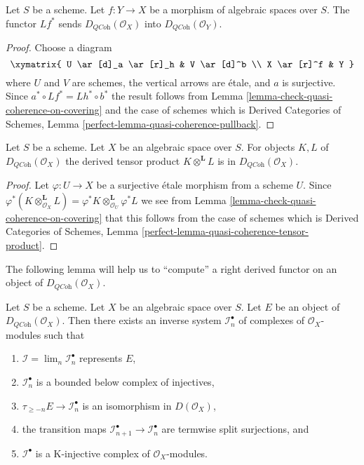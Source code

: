\begin{lemma}
\label{lemma-quasi-coherence-pullback}
Let $S$ be a scheme.
Let $f : Y \to X$ be a morphism of algebraic spaces over $S$.
The functor $Lf^*$ sends $D_{\textit{QCoh}}(\mathcal{O}_X)$
into $D_{\textit{QCoh}}(\mathcal{O}_Y)$.
\end{lemma}

\begin{proof}
Choose a diagram
$$
\xymatrix{
U \ar[d]_a \ar[r]_h & V \ar[d]^b \\
X \ar[r]^f & Y
}
$$
where $U$ and $V$ are schemes, the vertical arrows are \'etale, and
$a$ is surjective. Since $a^* \circ Lf^* = Lh^* \circ b^*$ the result
follows from
Lemma \ref{lemma-check-quasi-coherence-on-covering}
and the case of schemes which is
Derived Categories of Schemes, Lemma
\ref{perfect-lemma-quasi-coherence-pullback}.
\end{proof}

\begin{lemma}
\label{lemma-quasi-coherence-tensor-product}
Let $S$ be a scheme. Let $X$ be an algebraic space over $S$.
For objects $K, L$ of $D_{\textit{QCoh}}(\mathcal{O}_X)$
the derived tensor product $K \otimes^\mathbf{L} L$ is in
$D_{\textit{QCoh}}(\mathcal{O}_X)$.
\end{lemma}

\begin{proof}
Let $\varphi : U \to X$ be a surjective \'etale morphism from a scheme $U$.
Since
$\varphi^*(K \otimes_{\mathcal{O}_X}^\mathbf{L} L) =
\varphi^*K \otimes_{\mathcal{O}_U}^\mathbf{L} \varphi^*L$
we see from
Lemma \ref{lemma-check-quasi-coherence-on-covering}
that this follows from the case of schemes which is
Derived Categories of Schemes, Lemma
\ref{perfect-lemma-quasi-coherence-tensor-product}.
\end{proof}

\noindent
The following lemma will help us to ``compute'' a right derived functor
on an object of $D_{\textit{QCoh}}(\mathcal{O}_X)$.

\begin{lemma}
\label{lemma-nice-K-injective}
Let $S$ be a scheme. Let $X$ be an algebraic space over $S$. Let $E$ be an
object of $D_{\textit{QCoh}}(\mathcal{O}_X)$. Then there exists an inverse
system $\mathcal{I}_n^\bullet$ of complexes of $\mathcal{O}_X$-modules
such that
\begin{enumerate}
\item $\mathcal{I} = \lim_n \mathcal{I}_n^\bullet$ represents $E$,
\item $\mathcal{I}_n^\bullet$ is a bounded below complex of injectives,
\item $\tau_{\geq -n}E \to \mathcal{I}_n^\bullet$ is an isomorphism
in $D(\mathcal{O}_X)$,
\item the transition maps
$\mathcal{I}_{n + 1}^\bullet \to \mathcal{I}_n^\bullet$
are termwise split surjections, and
\item $\mathcal{I}^\bullet$ is a K-injective complex of
$\mathcal{O}_X$-modules.
\end{enumerate}
\end{lemma}

